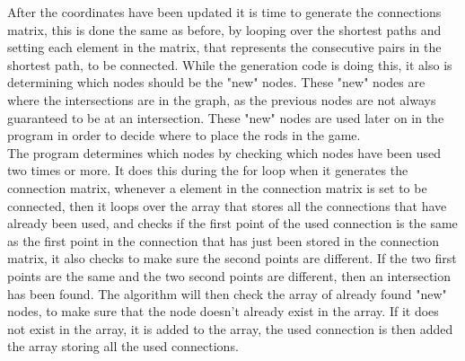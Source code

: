 
	After the coordinates have been updated it is time to generate the connections matrix, this is done the same as before, by looping over the shortest paths and setting each element in the matrix, that represents the consecutive pairs in the shortest path, to be connected. While the generation code is doing this, it also is determining which nodes should be the "new" nodes. These "new" nodes are where the intersections are in the graph, as the previous nodes are not always guaranteed to be at an intersection. These "new" nodes are used later on in the program in order to decide where to place the rods in the game.\\
	The program determines which nodes by checking which nodes have been used two times or more. It does this during the for loop when it generates the connection matrix, whenever a element in the connection matrix is set to be connected, then it loops over the array that stores all the connections that have already been used, and checks if the first point of the used connection is the same as the first point in the connection that has just been stored in the connection matrix, it also checks to make sure the second points are different. If the two first points are the same and the two second points are different, then an intersection has been found. The algorithm will then check the array of already found "new" nodes, to make sure that the node doesn't already exist in the array. If it does not exist in the array, it is added to the array, the used connection is then added the array storing all the used connections.\\


